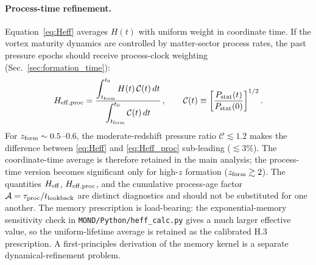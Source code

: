 \documentclass[11pt]{article}
\begin{document}
\paragraph{Process-time refinement.}
Equation~\eqref{eq:Heff} averages $H(t)$ with uniform weight in
coordinate time.  If the vortex maturity dynamics are controlled by
matter-sector process rates, the past pressure epochs should receive
process-clock weighting (Sec.~\ref{sec:formation_time}):
\begin{equation}\label{eq:Heff_proc}
  H_{\rm eff,proc}
  = \frac{\displaystyle\int_{t_{\rm form}}^{t_0}
      H(t)\,\mathcal{C}(t)\,dt}
    {\displaystyle\int_{t_{\rm form}}^{t_0}
      \mathcal{C}(t)\,dt}\,,
  \qquad
  \mathcal{C}(t)
  \equiv \left[\frac{P_{\rm stat}(t)}{P_{\rm stat}(0)}\right]^{1/2}.
\end{equation}
For $z_{\rm form}\sim 0.5$--$0.6$, the moderate-redshift pressure
ratio $\mathcal{C}\lesssim 1.2$ makes the difference between
\eqref{eq:Heff} and \eqref{eq:Heff_proc} sub-leading
($\lesssim 3\%$).  The coordinate-time average is therefore
retained in the main analysis; the process-time version becomes
significant only for high-$z$ formation ($z_{\rm form}\gtrsim 2$).
The quantities $H_{\rm eff}$, $H_{\rm eff,proc}$, and the cumulative
process-age factor $\mathcal{A}=\tau_{\rm proc}/t_{\rm lookback}$
are distinct diagnostics and should not be substituted for one another.
The memory prescription is load-bearing: the exponential-memory
sensitivity check in \texttt{MOND/Python/heff\_calc.py} gives a much
larger effective value, so the uniform-lifetime average is retained as
the calibrated H.3 prescription.  A first-principles derivation of the
memory kernel is a separate dynamical-refinement problem.
\end{document}
